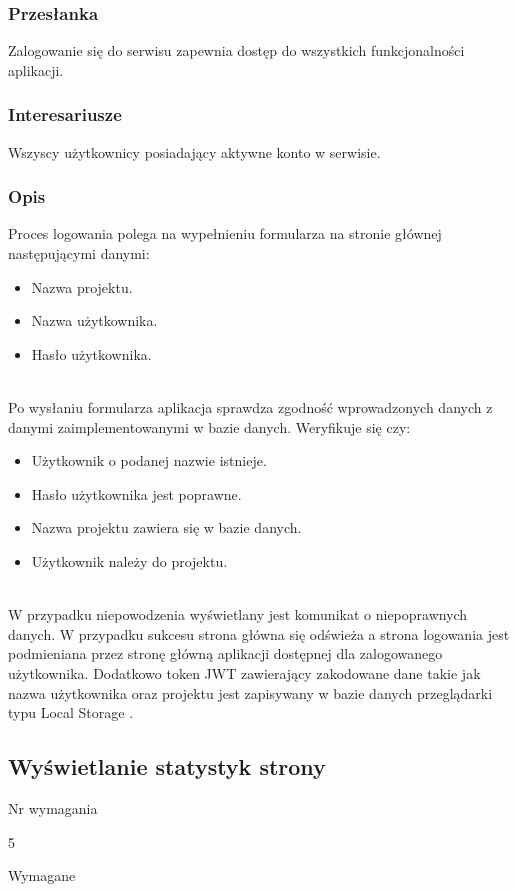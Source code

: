 \documentclass[eng,printmode]{mgr}
\begin{document}
\subsubsection{Przesłanka}
Zalogowanie się do serwisu zapewnia dostęp do wszystkich funkcjonalności aplikacji.

\subsubsection{Interesariusze}
Wszyscy użytkownicy posiadający aktywne konto w serwisie.

\subsubsection{Opis}
Proces logowania polega na wypełnieniu formularza na stronie głównej następującymi danymi:
\begin{itemize}
	\item[--] Nazwa projektu.
	\item[--] Nazwa użytkownika.
	\item[--] Hasło użytkownika.
\end{itemize}
\ \\
Po wysłaniu formularza aplikacja sprawdza zgodność wprowadzonych danych z danymi zaimplementowanymi w bazie danych. Weryfikuje się czy:
\begin{itemize}
	\item[--] Użytkownik o podanej nazwie istnieje.
	\item[--] Hasło użytkownika jest poprawne.
	\item[--] Nazwa projektu zawiera się w bazie danych.
	\item[--] Użytkownik należy do projektu.
\end{itemize}
\ \\
W przypadku niepowodzenia wyświetlany jest komunikat o niepoprawnych danych. W przypadku sukcesu strona główna się odświeża a strona logowania jest podmieniana przez stronę główną aplikacji dostępnej dla zalogowanego użytkownika. Dodatkowo token JWT zawierający zakodowane dane takie jak nazwa użytkownika oraz projektu jest zapisywany w bazie danych przeglądarki typu Local Storage \cite{Keyword_LocaLStorage}.

\subsection{Wyświetlanie statystyk strony}
\begin{labeling}{Nr wymagania}
\item [Nr wymagania:] 5
\item [Priorytet:] Wymagane
\end{labeling}
\end{document}
